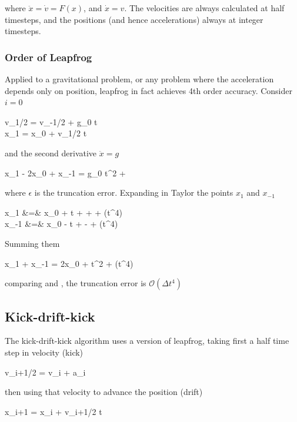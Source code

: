 where $\ddot{x} = \dot{v} = F(x)$, and $\dot{x}=v$. The
velocities are always calculated at half timesteps, and the positions (and hence accelerations) always at integer timesteps. 

\subsubsection{Order of Leapfrog} 

Applied to a gravitational problem, or any problem where the acceleration depends only on position,
leapfrog in fact achieves 4th order accuracy. Consider $i=0$

\beqn
v_{1/2} = v_{-1/2} + g_0 \Delta t \\
x_1 = x_0 + v_{1/2} \Delta t
\eeqn

and the second derivative $\ddot{x}=g$

\beq
x_1 - 2x_0 + x_{-1} = g_0 \Delta t^2 + \epsilon
\label{eq:leap1}
\eeq

where $\epsilon$ is the truncation error. Expanding in Taylor the points $x_1$ and $x_{-1}$

\beqn
x_1 &=& x_0 + \Delta t +  +  + \left(\Delta t^4\right)\\
x_{-1} &=& x_0 - \Delta t +  -  + \left(\Delta t^4\right)\\
\eeqn

Summing them

\beq
x_1 + x_{-1} = 2x_0 + \Delta t^2 + \left(\Delta t^4\right)
\label{eq:leap2}
\eeq

comparing  and , the truncation error is $\mathcal{O}\left(\Delta t^4\right)$

\subsection{Kick-drift-kick}

The kick-drift-kick algorithm uses a version of leapfrog, taking first a half time step in velocity (kick)

\beq
v_{i+1/2} = v_i + a_i
\label{eq:kick1}
\eeq

\noindent then using that velocity to advance the position (drift)


\beq
x_{i+1} = x_i + v_{i+1/2} \Delta t 
\label{eq:drift}
\eeq


